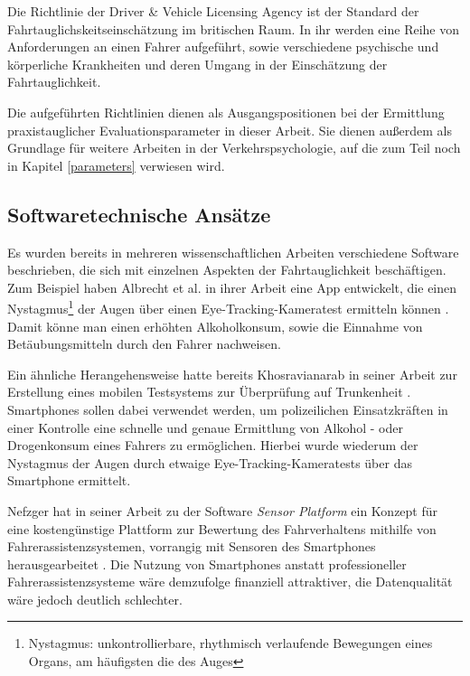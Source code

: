 Die Richtlinie der Driver \& Vehicle Licensing Agency \cite{drivervehiclelicencingagency} ist der Standard der Fahrtauglichskeitseinschätzung im britischen Raum. In ihr werden eine Reihe von Anforderungen an einen Fahrer aufgeführt, sowie verschiedene psychische und körperliche Krankheiten und deren Umgang in der Einschätzung der Fahrtauglichkeit.

Die aufgeführten Richtlinien dienen als Ausgangspositionen bei der Ermittlung praxistauglicher Evaluationsparameter in dieser Arbeit. Sie dienen außerdem als Grundlage für weitere Arbeiten in der Verkehrspsychologie, auf die zum Teil noch in Kapitel \ref{parameters} verwiesen wird.

\subsection{Softwaretechnische Ansätze}

Es wurden bereits in mehreren wissenschaftlichen Arbeiten verschiedene Software beschrieben, die sich mit einzelnen Aspekten der Fahrtauglichkeit beschäftigen. Zum Beispiel haben Albrecht et al. in ihrer Arbeit eine App entwickelt, die einen Nystagmus\footnote{\label{foot:nystagmus} Nystagmus: unkontrollierbare, rhythmisch verlaufende Bewegungen eines Organs, am häufigsten die des Auges}  der Augen über einen Eye-Tracking-Kameratest ermitteln können \cite{mobilesmarttracking}. Damit könne man einen erhöhten Alkoholkonsum, sowie die Einnahme von Betäubungsmitteln durch den Fahrer nachweisen.

Ein ähnliche Herangehensweise hatte bereits Khosravianarab in seiner Arbeit zur Erstellung eines mobilen Testsystems zur Überprüfung auf Trunkenheit \cite{sobrietymobiletests}. Smartphones sollen dabei verwendet werden, um polizeilichen Einsatzkräften in einer Kontrolle eine schnelle und genaue Ermittlung von Alkohol - oder Drogenkonsum eines Fahrers zu ermöglichen. Hierbei wurde wiederum der Nystagmus der Augen durch etwaige Eye-Tracking-Kameratests über das Smartphone ermittelt.

Nefzger hat in seiner Arbeit zu der Software \textit{Sensor Platform} ein Konzept für eine kostengünstige Plattform zur Bewertung des Fahrverhaltens mithilfe von Fahrerassistenzsystemen, vorrangig mit Sensoren des Smartphones herausgearbeitet \cite{smartphoneresearchplatform}. Die Nutzung von Smartphones anstatt professioneller Fahrerassistenzsysteme wäre demzufolge finanziell attraktiver, die Datenqualität wäre jedoch deutlich schlechter.

